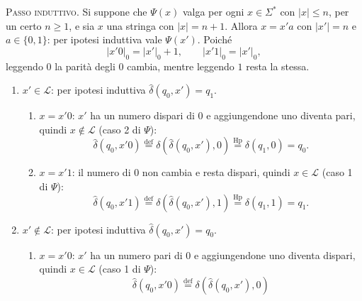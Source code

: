 \documentclass[a4paper, 11pt, oneside]{book}
\theoremstyle{formale}
\begin{document}
    \textsc{Passo induttivo}. Si suppone che $\Psi(x)$ valga per ogni $x \in \Sigma^*$ con
    $|x| \leq n$, per un certo $n \geq 1$, e sia $x$ una stringa con $|x| = n + 1$. Allora
    $x = x'a$ con $|x'| = n$ e $a \in \{0, 1\}$: per ipotesi induttiva vale $\Psi(x')$.
    Poich\'e
    \begin{equation*}
        |x'0|_0 = |x'|_0 + 1, \qquad |x'1|_0 = |x'|_0,
    \end{equation*}
    leggendo $0$ la parit\`a degli $0$ cambia, mentre leggendo $1$ resta la stessa.
    \begin{enumerate}
        \item $x' \in \mathcal{L}$: per ipotesi induttiva $\hat{\delta}(q_0, x') = q_1$.
            \begin{enumerate}[label=\arabic{enumi}\alph*.]
                \item $x = x'0$: $x'$ ha un numero dispari di $0$ e aggiungendone uno
                    diventa pari, quindi $x \notin \mathcal{L}$ (caso 2 di $\Psi$):
                    \begin{equation*}
                        \hat{\delta}(q_0, x'0)
                        \overset{\text{def}}{=} \delta(\hat{\delta}(q_0, x'), 0)
                        \overset{\text{Hp}}{=} \delta(q_1, 0) = q_0.
                    \end{equation*}
                \item $x = x'1$: il numero di $0$ non cambia e resta dispari, quindi
                    $x \in \mathcal{L}$ (caso 1 di $\Psi$):
                    \begin{equation*}
                        \hat{\delta}(q_0, x'1)
                        \overset{\text{def}}{=} \delta(\hat{\delta}(q_0, x'), 1)
                        \overset{\text{Hp}}{=} \delta(q_1, 1) = q_1.
                    \end{equation*}
            \end{enumerate}
        \item $x' \notin \mathcal{L}$: per ipotesi induttiva $\hat{\delta}(q_0, x') = q_0$.
            \begin{enumerate}[label=\arabic{enumi}\alph*.]
                \item $x = x'0$: $x'$ ha un numero pari di $0$ e aggiungendone uno
                    diventa dispari, quindi $x \in \mathcal{L}$ (caso 1 di $\Psi$):
                    \begin{equation*}
                        \hat{\delta}(q_0, x'0)
                        \overset{\text{def}}{=} \delta(\hat{\delta}(q_0, x'), 0)

\end{equation*}
\end{enumerate}
\end{enumerate}
\end{document}

